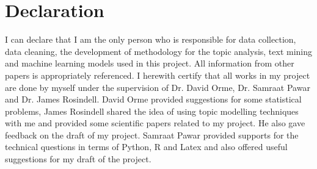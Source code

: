 \section*{Declaration}

I can declare that I am the only person who is responsible for data collection, data cleaning, the development of methodology for the topic analysis, text mining and machine learning models used in this project. All information from other papers is appropriately referenced. I herewith certify that all works in my project are done by myself under the supervision of Dr. David Orme, Dr. Samraat Pawar and Dr. James Rosindell. David Orme provided suggestions for some statistical problems, James Rosindell shared the idea of using topic modelling techniques with me and provided some scientific papers related to my project. He also gave feedback on the draft of my project. Samraat Pawar provided supports for the technical questions in terms of Python, R and Latex and also offered useful suggestions for my draft of the project.
